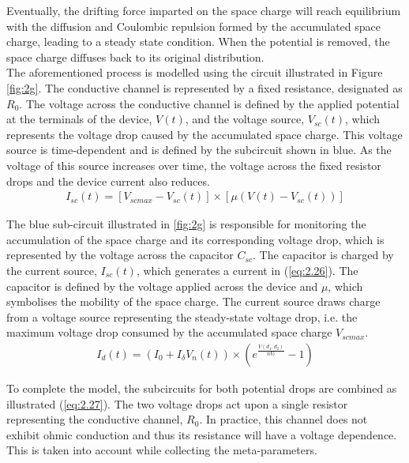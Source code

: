 \noindent Eventually, the drifting force imparted on the space charge will reach equilibrium with the diffusion and Coulombic repulsion formed by the accumulated space charge, leading to a steady state condition. When the potential is removed, the space charge diffuses back to its original distribution. \\

\noindent The aforementioned process is modelled using the circuit illustrated in Figure \ref{fig:2g}. The conductive channel is represented by a fixed resistance, designated as $R_0$. The voltage across the conductive channel is defined by the applied potential at the terminals of the device, $V(t)$, and the voltage source, $V_{sc}(t)$, which represents the voltage drop caused by the accumulated space charge. This voltage source is time-dependent and is defined by the subcircuit shown in blue. As the voltage of this source increases over time, the voltage across the fixed resistor drops and the device current also reduces.
\begin{align}
I_{sc}(t) = \left[ V_{scmax} - V_{sc}(t) \right] \times \left[ \mu \left( V(t) - V_{sc}(t) \right) \right] \label{eq:2.26} 
\end{align}

\noindent The blue sub-circuit illustrated in \ref{fig:2g} is responsible for monitoring the accumulation of the space charge and its corresponding voltage drop, which is represented by the voltage across the capacitor $C_{sc}$. The capacitor is charged by the current source, $I_{sc}(t)$, which generates a current in (\ref{eq:2.26}). The capacitor is defined by the voltage applied across the device and $\mu$, which symbolises the mobility of the space charge. The current source draws charge from a voltage source representing the steady-state voltage drop, i.e. the maximum voltage drop consumed by the accumulated space charge $V_{scmax}$.
\begin{align}
I_d(t) = \left( I_0 + I_{\delta} V_n(t) \right)\times \left( e^{\frac{V(d_1,d_2)}{nV_t} }  - 1\right) \label{eq:2.27}
\end{align}

\noindent To complete the model, the subcircuits for both potential drops are combined as illustrated (\ref{eq:2.27}). The two voltage drops act upon a single resistor representing the conductive channel, $R_0$. In practice, this channel does not exhibit ohmic conduction and thus its resistance will have a voltage dependence. This is taken into account while collecting the meta-parameters.

